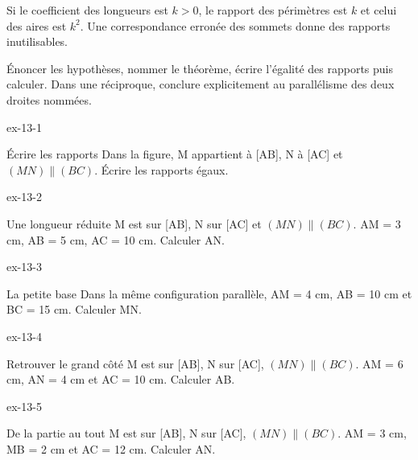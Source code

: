 \begin{propriete}Si le coefficient des longueurs est $k>0$, le rapport des périmètres est $k$ et celui des aires est $k^2$. Une correspondance erronée des sommets donne des rapports inutilisables.\end{propriete}
\begin{savoirfaire}[Rédiger]Énoncer les hypothèses, nommer le théorème, écrire l’égalité des rapports puis calculer. Dans une réciproque, conclure explicitement au parallélisme des deux droites nommées.\end{savoirfaire}
\clearpage{}
\begin{blocLivre}{ex-13-1}\begin{exercice}[1]{Écrire les rapports}
Dans la figure, M appartient à [AB], N à [AC] et $(MN)\parallel(BC)$. Écrire les rapports égaux.
\label{fig-ex-13-1}
\end{exercice}\end{blocLivre}
\begin{blocLivre}{ex-13-2}\begin{exercice}[1]{Une longueur réduite}
M est sur [AB], N sur [AC] et $(MN)\parallel(BC)$. AM = 3 cm, AB = 5 cm, AC = 10 cm. Calculer AN.
\label{fig-ex-13-2}
\end{exercice}\end{blocLivre}
\begin{blocLivre}{ex-13-3}\begin{exercice}[1]{La petite base}
Dans la même configuration parallèle, AM = 4 cm, AB = 10 cm et BC = 15 cm. Calculer MN.
\label{fig-ex-13-3}
\end{exercice}\end{blocLivre}
\begin{blocLivre}{ex-13-4}\begin{exercice}[1]{Retrouver le grand côté}
M est sur [AB], N sur [AC], $(MN)\parallel(BC)$. AM = 6 cm, AN = 4 cm et AC = 10 cm. Calculer AB.
\label{fig-ex-13-4}
\end{exercice}\end{blocLivre}
\begin{blocLivre}{ex-13-5}\begin{exercice}[1]{De la partie au tout}
M est sur [AB], N sur [AC], $(MN)\parallel(BC)$. AM = 3 cm, MB = 2 cm et AC = 12 cm. Calculer AN.
\label{fig-ex-13-5}
\end{exercice}\end{blocLivre}

